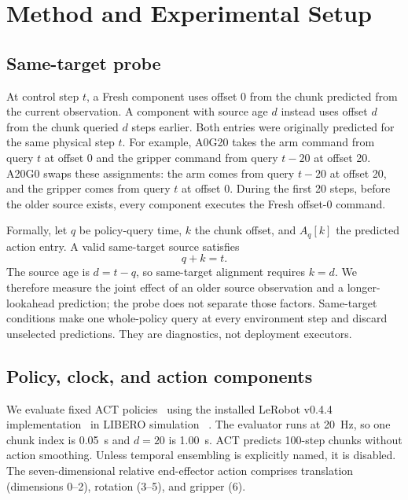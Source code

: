 \section{Method and Experimental Setup}
\label{sec:setup}

\subsection{Same-target probe}
\label{sec:same-target}

At control step $t$, a Fresh component uses offset 0 from the chunk predicted
from the current observation. A component with source age $d$ instead uses
offset $d$ from the chunk queried $d$ steps earlier. Both entries were
originally predicted for the same physical step $t$. For example, A0G20 takes
the arm command from query $t$ at offset 0 and the gripper command from query
$t-20$ at offset 20. A20G0 swaps these assignments: the arm comes from query
$t-20$ at offset 20, and the gripper comes from query $t$ at offset 0. During
the first 20 steps, before the older source exists, every component executes
the Fresh offset-0 command.

Formally, let $q$ be policy-query time, $k$ the chunk offset, and $A_q[k]$
the predicted action entry. A valid same-target source satisfies
\begin{equation}
q + k = t .
\label{eq:same-target}
\end{equation}
The source age is $d=t-q$, so same-target alignment requires $k=d$. We
therefore measure the joint effect of an older source observation and a
longer-lookahead prediction; the probe does not separate those factors.
Same-target conditions make one whole-policy query at every environment step
and discard unselected predictions. They are diagnostics, not deployment
executors.

\subsection{Policy, clock, and action components}

We evaluate fixed ACT policies~\cite{zhao2023act} using the installed LeRobot
v0.4.4 implementation~\cite{cadene2026lerobot} in LIBERO simulation
~\cite{liu2023libero}. The evaluator runs at 20~Hz, so one chunk index is
0.05~s and $d=20$ is 1.00~s. ACT predicts 100-step chunks without action
smoothing. Unless temporal ensembling is explicitly named, it is disabled.
The seven-dimensional relative end-effector action comprises translation
(dimensions 0--2), rotation (3--5), and gripper (6).

